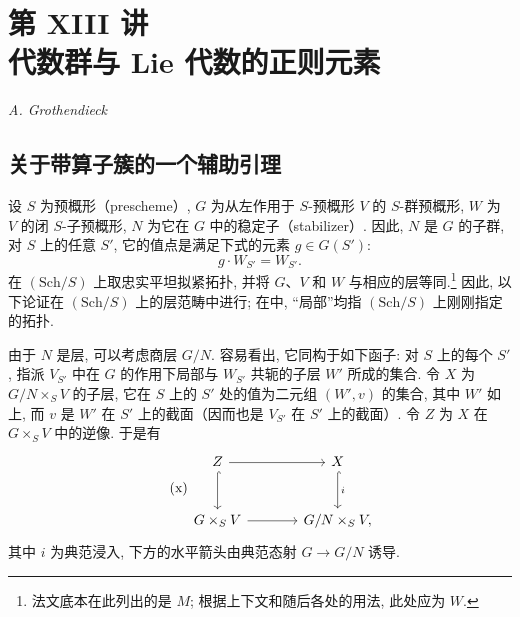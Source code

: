 

\chapter*{第 XIII 讲\\代数群与 Lie 代数的正则元素}

\begin{center}
\textit{A. Grothendieck}
\end{center}

\section{关于带算子簇的一个辅助引理}

设 \(S\) 为预概形（prescheme）, \(G\) 为从左作用于 \(S\)-预概形 \(V\) 的 \(S\)-群预概形, \(W\) 为 \(V\) 的闭 \(S\)-子预概形, \(N\) 为它在 \(G\) 中的稳定子（stabilizer）.
因此, \(N\) 是 \(G\) 的子群, 对 \(S\) 上的任意 \(S'\), 它的值点是满足下式的元素 \(g\in G(S')\):
\[
  g\cdot W_{S'}=W_{S'}.
\]
在 \((\mathrm{Sch}/S)\) 上取忠实平坦拟紧拓扑, 并将 \(G\)、\(V\) 和 \(W\) 与相应的层等同.\footnote{法文底本在此列出的是 \(M\); 根据上下文和随后各处的用法, 此处应为 \(W\).}
因此, 以下论证在 \((\mathrm{Sch}/S)\) 上的层范畴中进行; 在中, “局部”均指 \((\mathrm{Sch}/S)\) 上刚刚指定的拓扑.

由于 \(N\) 是层, 可以考虑商层 \(G/N\). 容易看出, 它同构于如下函子: 对 \(S\) 上的每个 \(S'\), 指派 \(V_{S'}\) 中在 \(G\) 的作用下局部与 \(W_{S'}\) 共轭的子层 \(W'\) 所成的集合.
令 \(X\) 为 \(G/N\times_S V\) 的子层, 它在 \(S\) 上的 \(S'\) 处的值为二元组 \((W',v)\) 的集合, 其中 \(W'\) 如上, 而 \(v\) 是 \(W'\) 在 \(S'\) 上的截面（因而也是 \(V_{S'}\) 在 \(S'\) 上的截面）. 令 \(Z\) 为 \(X\) 在 \(G\times_S V\) 中的逆像. 于是有
\[
\tag{x}\label{sga3:xiii:equation:x}
\begin{tikzcd}[column sep=large,row sep=large]
Z \arrow[r] \arrow[d,hook] & X \arrow[d,hook,"i"] \\
G\times_S V \arrow[r] & G/N\times_S V ,
\end{tikzcd}
\]
其中 \(i\) 为典范浸入, 下方的水平箭头由典范态射 \(G\to G/N\) 诱导.

